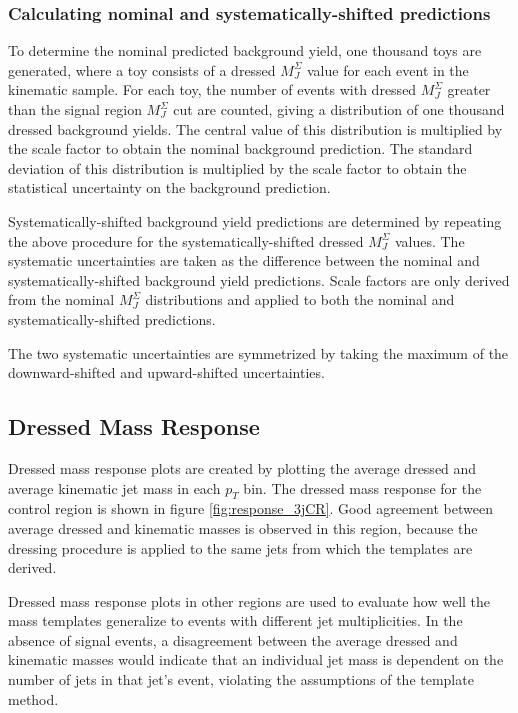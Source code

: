\subsubsection{Calculating nominal and systematically-shifted
  predictions}
To determine the nominal predicted background yield, one thousand toys
are generated, where a toy consists of a dressed $M_{J}^{\Sigma}$ value for
each event in the kinematic sample. For each toy, the number of events
with dressed $M_{J}^{\Sigma}$ greater than the signal region
$M_{J}^{\Sigma}$ cut are counted, giving a distribution of one
thousand dressed background yields. The central value of this distribution is
multiplied by the scale factor to obtain the nominal background
prediction. The standard deviation of this distribution is multiplied
by the scale factor to obtain the statistical uncertainty on the
background prediction.

Systematically-shifted background yield predictions are determined by repeating
the above procedure for the systematically-shifted dressed
$M_{J}^{\Sigma}$ values. The systematic uncertainties are taken as the
difference between the nominal and systematically-shifted background
yield predictions. Scale factors are only derived from the nominal
$M_{J}^{\Sigma}$ distributions and applied to both the nominal and
systematically-shifted predictions.

The two systematic uncertainties are symmetrized by taking the maximum
of the downward-shifted and upward-shifted uncertainties.

\subsection{Dressed Mass Response} \label{response}
Dressed mass response plots are created by plotting the average
dressed and average kinematic jet mass in each $p_T$ bin. The dressed mass
response for the control region is shown in figure
\ref{fig:response_3jCR}. Good agreement between average dressed and
kinematic masses is observed in this region, because the dressing
procedure is applied to the same jets from which the templates are
derived.

Dressed mass response plots in other regions are used to evaluate how
well the mass templates generalize to events with different jet multiplicities. In the absence of
signal events, a disagreement between the average dressed and
kinematic masses would indicate that an individual jet mass is
dependent on the number of jets in that jet's event, violating
the assumptions of the template method.

